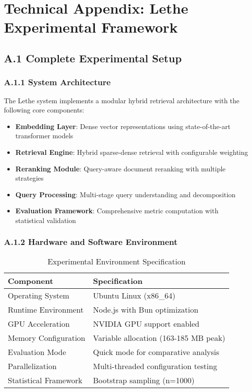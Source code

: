 \documentclass{article}
\begin{document}
\section*{Technical Appendix: Lethe Experimental Framework}

\subsection{A.1 Complete Experimental Setup}

\subsubsection{A.1.1 System Architecture}
The Lethe system implements a modular hybrid retrieval architecture with the following core components:

\begin{itemize}
\item \textbf{Embedding Layer}: Dense vector representations using state-of-the-art transformer models
\item \textbf{Retrieval Engine}: Hybrid sparse-dense retrieval with configurable weighting
\item \textbf{Reranking Module}: Query-aware document reranking with multiple strategies
\item \textbf{Query Processing}: Multi-stage query understanding and decomposition
\item \textbf{Evaluation Framework}: Comprehensive metric computation with statistical validation
\end{itemize}

\subsubsection{A.1.2 Hardware and Software Environment}
\begin{table}[h]
\centering
\caption{Experimental Environment Specification}
\begin{tabular}{@{}ll@{}}
\toprule
\textbf{Component} & \textbf{Specification} \\
\midrule
Operating System & Ubuntu Linux (x86\_64) \\
Runtime Environment & Node.js with Bun optimization \\
GPU Acceleration & NVIDIA GPU support enabled \\
Memory Configuration & Variable allocation (163-185 MB peak) \\
Evaluation Mode & Quick mode for comparative analysis \\
Parallelization & Multi-threaded configuration testing \\
Statistical Framework & Bootstrap sampling (n=1000) \\
\bottomrule
\end{tabular}
\end{table}
\end{document}
